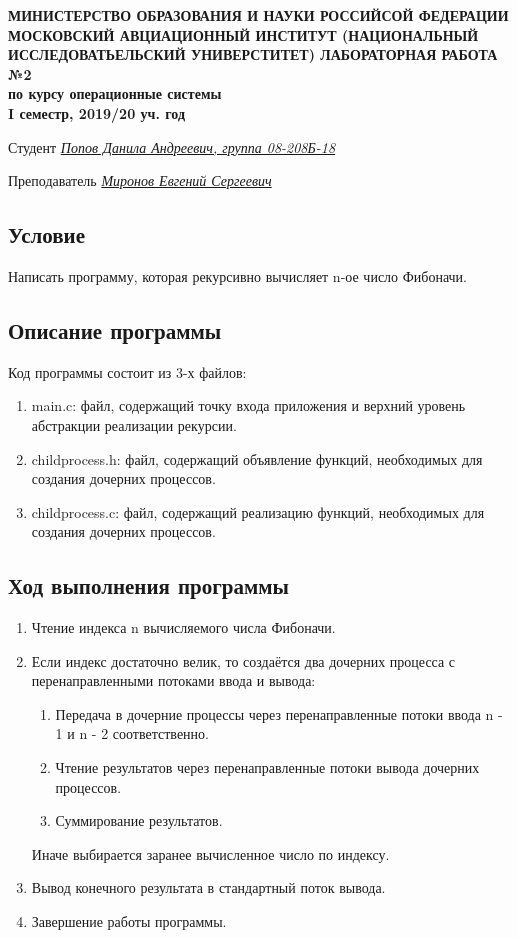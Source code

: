 \documentclass[12pt]{article}
\begin{document}
\begin{titlepage}
\begin{center}
\textbf{МИНИСТЕРСТВО ОБРАЗОВАНИЯ И НАУКИ РОССИЙСОЙ ФЕДЕРАЦИИ
\medskip
МОСКОВСКИЙ АВЦИАЦИОННЫЙ ИНСТИТУТ
(НАЦИОНАЛЬНЫЙ ИССЛЕДОВАТЬЕЛЬСКИЙ УНИВЕРСТИТЕТ)
\vfill\vfill
{\Huge ЛАБОРАТОРНАЯ РАБОТА №2}\\
по курсу операционные системы\\
I семестр, 2019/20 уч. год}
\end{center}
\vfill

Студент \uline{\it {Попов Данила Андреевич, группа 08-208Б-18}\hfill}

Преподаватель \uline{\it {Миронов Евгений Сергеевич}\hfill}

\vfill
\end{titlepage}

\subsection*{Условие}

Написать программу, которая рекурсивно вычисляет n-ое число Фибоначи.

\subsection*{Описание программы}

Код программы состоит из 3-х файлов:
\begin{enumerate}
\item main.c: файл, содержащий точку входа приложения и верхний уровень абстракции реализации рекурсии.
\item childprocess.h: файл, содержащий объявление функций, необходимых для создания дочерних процессов.
\item childprocess.c: файл, содержащий реализацию функций, необходимых для создания дочерних процессов.
\end{enumerate}

\subsection*{Ход выполнения программы}
\begin{enumerate}
\item Чтение индекса n вычисляемого числа Фибоначи.
\item Если индекс достаточно велик, то создаётся два дочерних процесса с перенаправленными потоками ввода и вывода:
\begin{enumerate}
\item Передача в дочерние процессы через перенаправленные потоки ввода n - 1 и n - 2 соответственно.
\item Чтение результатов через перенаправленные потоки вывода дочерних процессов.
\item Суммирование результатов.
\end{enumerate}
Иначе выбирается заранее вычисленное число по индексу.
\item Вывод конечного результата в стандартный поток вывода.
\item Завершение работы программы.
\end{enumerate}
\end{document}
